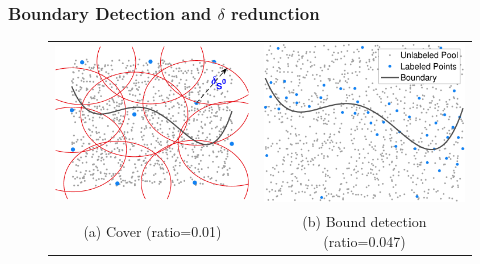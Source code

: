 \documentclass[11pts]{beamer}
\begin{document}

\begin{frame}%
\frametitle{Boundary Detection and $\delta$ redunction}
\begin{figure}[ht]
 \begin{tabular}{cc}
   \includegraphics[scale=0.4]{BOUND/COVER.pdf} &
    \includegraphics[scale=0.4]{BOUND/SELECTION_PROCES.pdf}
   \\
    (a) Cover (ratio=0.01) & (b) Bound detection (ratio=0.047)\\
 \end{tabular}
 \bigskip
\end{figure}
\end{frame}
\end{document}
